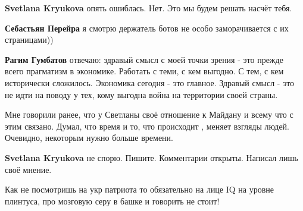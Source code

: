 \begin{itemize}
\begin{itemize}
\textbf{Svetlana Kryukova} опять ошиблась. Нет. Это мы будем решать насчёт тебя.

 
\textbf{Себастьян Перейра} я смотрю держатель ботов не особо заморачивается с их страницами))

 
\textbf{Рагим Гумбатов} отвечаю:
здравый смысл с моей точки зрения - это прежде всего прагматизм в экономике. Работать с теми, с кем выгодно. С тем, с кем исторически сложилось.
Экономика сегодня - это главное.
Здравый смысл - это не идти на поводу у тех, кому выгодна война на территории своей страны.

 
Мне говорили ранее, что у Светланы своё отношение к Майдану и всему что с этим связано. Думал, что время и то, что происходит , меняет взгляды людей.
Очевидно, некоторым нужно больше времени.

 
\textbf{Svetlana Kryukova} не спорю. Пишите. Комментарии открыты. Написал лишь своё мнение.

 
Как не посмотришь на укр патриота то обязательно на лице IQ на уровне плинтуса, про мозговую серу в башке и говорить не стоит!

 

\end{itemize}
\end{itemize}
